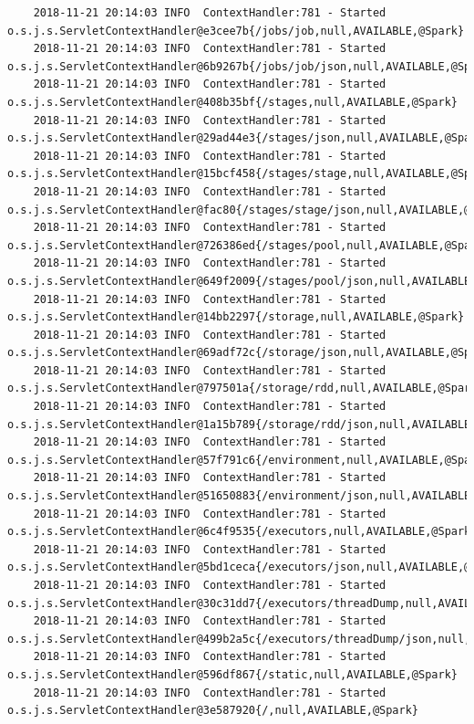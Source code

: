 \documentclass[11pt, letterpaper]{article}
\begin{document}
\begin{lstlisting}
	2018-11-21 20:14:03 INFO  ContextHandler:781 - Started o.s.j.s.ServletContextHandler@e3cee7b{/jobs/job,null,AVAILABLE,@Spark}
	2018-11-21 20:14:03 INFO  ContextHandler:781 - Started o.s.j.s.ServletContextHandler@6b9267b{/jobs/job/json,null,AVAILABLE,@Spark}
	2018-11-21 20:14:03 INFO  ContextHandler:781 - Started o.s.j.s.ServletContextHandler@408b35bf{/stages,null,AVAILABLE,@Spark}
	2018-11-21 20:14:03 INFO  ContextHandler:781 - Started o.s.j.s.ServletContextHandler@29ad44e3{/stages/json,null,AVAILABLE,@Spark}
	2018-11-21 20:14:03 INFO  ContextHandler:781 - Started o.s.j.s.ServletContextHandler@15bcf458{/stages/stage,null,AVAILABLE,@Spark}
	2018-11-21 20:14:03 INFO  ContextHandler:781 - Started o.s.j.s.ServletContextHandler@fac80{/stages/stage/json,null,AVAILABLE,@Spark}
	2018-11-21 20:14:03 INFO  ContextHandler:781 - Started o.s.j.s.ServletContextHandler@726386ed{/stages/pool,null,AVAILABLE,@Spark}
	2018-11-21 20:14:03 INFO  ContextHandler:781 - Started o.s.j.s.ServletContextHandler@649f2009{/stages/pool/json,null,AVAILABLE,@Spark}
	2018-11-21 20:14:03 INFO  ContextHandler:781 - Started o.s.j.s.ServletContextHandler@14bb2297{/storage,null,AVAILABLE,@Spark}
	2018-11-21 20:14:03 INFO  ContextHandler:781 - Started o.s.j.s.ServletContextHandler@69adf72c{/storage/json,null,AVAILABLE,@Spark}
	2018-11-21 20:14:03 INFO  ContextHandler:781 - Started o.s.j.s.ServletContextHandler@797501a{/storage/rdd,null,AVAILABLE,@Spark}
	2018-11-21 20:14:03 INFO  ContextHandler:781 - Started o.s.j.s.ServletContextHandler@1a15b789{/storage/rdd/json,null,AVAILABLE,@Spark}
	2018-11-21 20:14:03 INFO  ContextHandler:781 - Started o.s.j.s.ServletContextHandler@57f791c6{/environment,null,AVAILABLE,@Spark}
	2018-11-21 20:14:03 INFO  ContextHandler:781 - Started o.s.j.s.ServletContextHandler@51650883{/environment/json,null,AVAILABLE,@Spark}
	2018-11-21 20:14:03 INFO  ContextHandler:781 - Started o.s.j.s.ServletContextHandler@6c4f9535{/executors,null,AVAILABLE,@Spark}
	2018-11-21 20:14:03 INFO  ContextHandler:781 - Started o.s.j.s.ServletContextHandler@5bd1ceca{/executors/json,null,AVAILABLE,@Spark}
	2018-11-21 20:14:03 INFO  ContextHandler:781 - Started o.s.j.s.ServletContextHandler@30c31dd7{/executors/threadDump,null,AVAILABLE,@Spark}
	2018-11-21 20:14:03 INFO  ContextHandler:781 - Started o.s.j.s.ServletContextHandler@499b2a5c{/executors/threadDump/json,null,AVAILABLE,@Spark}
	2018-11-21 20:14:03 INFO  ContextHandler:781 - Started o.s.j.s.ServletContextHandler@596df867{/static,null,AVAILABLE,@Spark}
	2018-11-21 20:14:03 INFO  ContextHandler:781 - Started o.s.j.s.ServletContextHandler@3e587920{/,null,AVAILABLE,@Spark}

\end{lstlisting}
\end{document}
